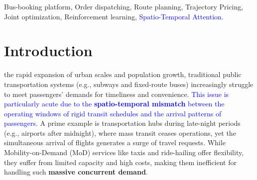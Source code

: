 \documentclass[lettersize,journal]{IEEEtran}
\begin{document}
\begin{abstract}
\textcolor{blue}{Bus-booking platforms have emerged as a critical component of Intelligent Transportation Systems (ITS), bridging the gap between rigid public transit and expensive ride-hailing services. However, operational efficiency is hindered by the intrinsic coupling of three decision-making tasks: Order Dispatching, Route Planning, and Trajectory Pricing, particularly under time-varying demand with bounded fluctuation amplitude. Existing solutions often treat these tasks in isolation or rely on stationary assumptions, failing to adapt to real-world volatility. In this paper, we formally define the Joint order Dispatching, Route planning, and Trajectory Pricing (JDRP) problem and prove its NP-hardness. Moreover, we distinguish between Stationary JDRP and Robust JDRP. We propose ST-SACA, an end-to-end framework based on maximum entropy Deep Reinforcement Learning (DRL). Distinguishing itself from standard architectures, ST-SACA incorporates a novel Spatio-Temporal Adaptive Actor that explicitly integrates geographical topology with demand dynamics via self-attention mechanisms, enabling the agent to capture spatial dependencies among stations. Furthermore, we construct a realistic distance-aware demand-supply mechanism and a composite reward function to align profit maximization with service quality. Extensive experiments on a real-world vehicle trajectory dataset demonstrate that ST-SACA significantly outperforms state-of-the-art baselines in terms of long-term profit and order response rate, exhibiting stable performance across different fluctuation amplitudes. Codes are available at \url{https://github.com/GaoYucen/ST-SACA}.}
\end{abstract}

\begin{IEEEkeywords}
Bus-booking platform, Order dispatching, Route planning, Trajectory Pricing, Joint optimization, Reinforcement learning, \textcolor{blue}{Spatio-Temporal Attention}.
\end{IEEEkeywords}

\section{Introduction}
 the rapid expansion of urban scales and population growth, traditional public transportation systems (e.g., subways and fixed-route buses) increasingly struggle to meet passengers' demands for timeliness and convenience. \textcolor{blue}{This issue is particularly acute due to the \textbf{spatio-temporal mismatch} between the operating windows of rigid transit schedules and the arrival patterns of passengers.} A prime example is transportation hubs during late-night periods (e.g., airports after midnight), where mass transit ceases operations, yet the simultaneous arrival of flights generates a surge of travel requests. While Mobility-on-Demand (MoD) services like taxis and ride-hailing offer flexibility, they suffer from limited capacity and high costs, making them inefficient for handling such \textbf{massive concurrent demand}.
\end{document}
